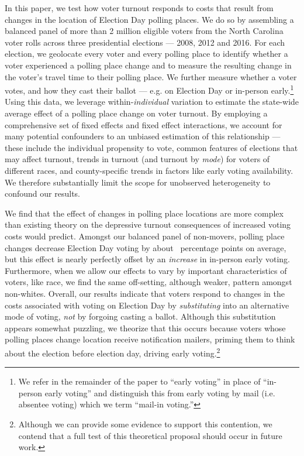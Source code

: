 \documentclass{cup_PSRM}
\begin{document}
In this paper, we test how voter turnout responds to costs that result from changes in the location of Election Day polling places.  We do so by assembling a  balanced panel of more than 2 million eligible voters from the North Carolina voter rolls across three presidential elections --- 2008, 2012 and 2016.  For each election, we geolocate every voter and every polling place to identify whether a voter experienced a polling place change and to measure the resulting change in the voter's travel time to their polling place.  We further measure whether a voter votes, and how they cast their ballot --- e.g. on Election Day or in-person early.\footnote{We refer in the remainder of the paper to ``early voting'' in place of ``in-person early voting'' and distinguish this from early voting by mail (i.e. absentee voting) which we term ``mail-in voting.''}  Using this data, we leverage within-\emph{individual} variation to estimate the state-wide average effect of a polling place change on voter turnout.  By employing a comprehensive set of fixed effects and fixed effect interactions, we account for many potential confounders to an unbiased estimation of this relationship --- these include the individual propensity to vote, common features of elections that may affect turnout, trends in turnout (and turnout by \emph{mode}) for voters of different races, and county-specific trends in factors like early voting availability.  We therefore substantially limit the scope for unobserved heterogeneity to confound our results.

We find that the effect of changes in polling place locations are more complex than existing theory on the depressive turnout consequences of increased voting costs would predict. Amongst our balanced panel of non-movers, polling place changes decrease Election Day voting by about \unskip~percentage points on average, but this effect is nearly perfectly offset by an \emph{increase} in in-person early voting.   Furthermore, when we allow our effects to vary by important characteristics of voters, like race, we find the same off-setting, although weaker, pattern amongst non-whites. Overall, our results indicate that voters respond to changes in the costs associated with voting on Election Day by \emph{substituting} into an alternative mode of voting, \emph{not} by forgoing casting a ballot. Although this substitution appears somewhat puzzling, we theorize that this occurs because voters whose polling places change location receive notification mailers, priming them to think about the election before election day, driving early voting.\footnote{Although we can provide some evidence to support this contention, we contend that a full test of this theoretical proposal should occur in future work.}
\end{document}
